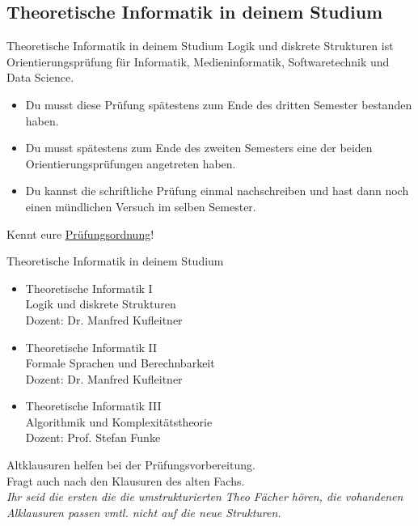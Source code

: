 \subsection{Theoretische Informatik in deinem Studium}
\begin{frame}[fragile]{Theoretische Informatik in deinem Studium}
    Logik und diskrete Strukturen ist Orientierungsprüfung für Informatik, Medieninformatik, Softwaretechnik und Data Science.
    \begin{itemize}
        \item Du musst diese Prüfung spätestens zum Ende des dritten Semester bestanden haben.
        \item Du musst spätestens zum Ende des zweiten Semesters eine der beiden Orientierungsprüfungen angetreten haben.
        \item Du kannst die schriftliche Prüfung einmal nachschreiben und hast dann noch einen mündlichen Versuch im selben Semester.
    \end{itemize}
    \alert{Kennt eure \href{https://www.student.uni-stuttgart.de/pruefungsorganisation/pruefungsordnung/}{\underline{Prüfungsordnung}}!}
\end{frame}

\begin{frame}{Theoretische Informatik in deinem Studium}
    \begin{itemize}
        \item Theoretische Informatik I\\
              Logik und diskrete Strukturen\\
              \quad Dozent: Dr. Manfred Kufleitner
        \item Theoretische Informatik II\\
              Formale Sprachen und Berechnbarkeit\\
              \quad Dozent: Dr. Manfred Kufleitner
        \item Theoretische Informatik III\\
              Algorithmik und Komplexitätstheorie\\
              \quad Dozent: Prof. Stefan Funke
    \end{itemize}
    \alert{Altklausuren helfen bei der Prüfungsvorbereitung. \\Fragt auch nach den Klausuren des alten Fachs.}\\
    \textit{Ihr seid die ersten die die umstrukturierten Theo Fächer hören, die vohandenen Alklausuren passen vmtl. nicht auf die neue Strukturen.}
\end{frame}

